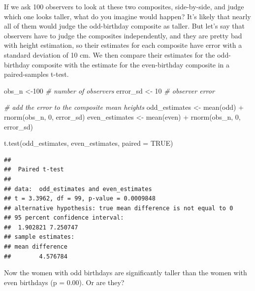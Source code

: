 \documentclass[
  doc,floatsintext]{apa6}
\newenvironment{Shaded}{\begin{snugshade}}{\end{snugshade}}
\newcommand{\AttributeTok}[1]{\textcolor[rgb]{0.77,0.63,0.00}{#1}}
\newcommand{\CommentTok}[1]{\textcolor[rgb]{0.56,0.35,0.01}{\textit{#1}}}
\newcommand{\ConstantTok}[1]{\textcolor[rgb]{0.00,0.00,0.00}{#1}}
\newcommand{\DecValTok}[1]{\textcolor[rgb]{0.00,0.00,0.81}{#1}}
\newcommand{\FunctionTok}[1]{\textcolor[rgb]{0.00,0.00,0.00}{#1}}
\newcommand{\NormalTok}[1]{#1}
\newcommand{\OtherTok}[1]{\textcolor[rgb]{0.56,0.35,0.01}{#1}}
\newcommand{\SpecialCharTok}[1]{\textcolor[rgb]{0.00,0.00,0.00}{#1}}
\begin{document}
If we ask 100 observers to look at these two composites, side-by-side, and judge which one looks taller, what do you imagine would happen? It's likely that nearly all of them would judge the odd-birthday composite as taller. But let's say that observers have to judge the composites independently, and they are pretty bad with height estimation, so their estimates for each composite have error with a standard deviation of 10 cm. We then compare their estimates for the odd-birthday composite with the estimate for the even-birthday composite in a paired-samples t-test.

\begin{Shaded}
\begin{Highlighting}[]
\NormalTok{obs\_n }\OtherTok{\textless{}{-}}\DecValTok{100} \CommentTok{\# number of observers}
\NormalTok{error\_sd }\OtherTok{\textless{}{-}} \DecValTok{10} \CommentTok{\# observer error}

\CommentTok{\# add the error to the composite mean heights}
\NormalTok{odd\_estimates }\OtherTok{\textless{}{-}} \FunctionTok{mean}\NormalTok{(odd) }\SpecialCharTok{+} \FunctionTok{rnorm}\NormalTok{(obs\_n, }\DecValTok{0}\NormalTok{, error\_sd)}
\NormalTok{even\_estimates }\OtherTok{\textless{}{-}} \FunctionTok{mean}\NormalTok{(even) }\SpecialCharTok{+} \FunctionTok{rnorm}\NormalTok{(obs\_n, }\DecValTok{0}\NormalTok{, error\_sd)}

\FunctionTok{t.test}\NormalTok{(odd\_estimates, even\_estimates, }\AttributeTok{paired =} \ConstantTok{TRUE}\NormalTok{)}
\end{Highlighting}
\end{Shaded}

\begin{verbatim}
## 
##  Paired t-test
## 
## data:  odd_estimates and even_estimates
## t = 3.3962, df = 99, p-value = 0.0009848
## alternative hypothesis: true mean difference is not equal to 0
## 95 percent confidence interval:
##  1.902821 7.250747
## sample estimates:
## mean difference 
##        4.576784
\end{verbatim}

Now the women with odd birthdays are significantly taller than the women with even birthdays (p = 0.00). Or are they?
\end{document}
